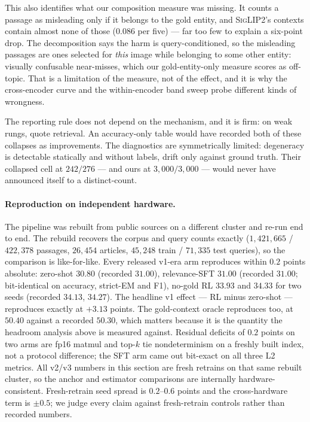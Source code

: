 This also identifies what our composition measure was missing. It counts a passage as
misleading only if it belongs to the gold entity, and \textsc{SigLIP2}'s contexts contain almost
none of those ($0.086$ per five) --- far too few to explain a six-point drop. The decomposition
says the harm is query-conditioned, so the misleading passages are ones selected for
\emph{this} image while belonging to some other entity: visually confusable near-misses, which
our gold-entity-only measure scores as off-topic. That is a limitation of the measure, not of the
effect, and it is why the cross-encoder curve and the within-encoder band sweep probe different
kinds of wrongness.

The reporting rule does not depend on the mechanism, and it is firm: on weak rungs, quote
retrieval. An accuracy-only table would have recorded both of these collapses as improvements.
The diagnostics are symmetrically limited: degeneracy is detectable statically and without
labels, drift only against ground truth. Their collapsed cell at $242/276$ --- and ours at
$3{,}000/3{,}000$ --- would never have announced itself to a distinct-count.


\paragraph{Reproduction on independent hardware.} The pipeline was rebuilt from public sources on
a different cluster and re-run end to end. The rebuild recovers the corpus and query counts
exactly ($1{,}421{,}665$ / $422{,}378$ passages, $26{,}454$ articles, $45{,}248$ train /
$71{,}335$ test queries), so the comparison is like-for-like. Every released v1-era arm
reproduces within $0.2$ points absolute: zero-shot $30.80$ (recorded $31.00$), relevance-SFT
$31.00$ (recorded $31.00$; bit-identical on accuracy, strict-EM and F1), no-gold RL $33.93$ and
$34.33$ for two seeds (recorded $34.13$, $34.27$). The headline v1 effect --- RL minus zero-shot
--- reproduces exactly at $+3.13$ points. The gold-context oracle reproduces too, at $50.40$
against a recorded $50.30$, which matters because it is the quantity the headroom analysis above
is measured against. Residual deficits of $0.2$ points on two arms are fp16
matmul and top-$k$ tie nondeterminism on a freshly built index, not a protocol difference; the
SFT arm came out bit-exact on all three L2 metrics. All v2/v3 numbers in this section are fresh
retrains on that same rebuilt cluster, so the anchor and estimator comparisons are internally
hardware-consistent. Fresh-retrain seed spread is $0.2$--$0.6$ points and the cross-hardware term
is ${\pm}0.5$; we judge every claim against fresh-retrain controls rather than recorded numbers.

